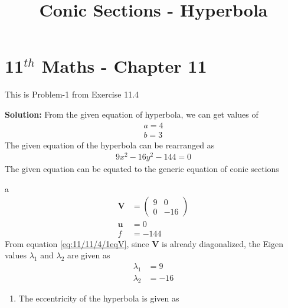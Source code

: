 \documentclass[12pt]{article}
\providecommand{\brak}[1]{\ensuremath{\left(#1\right)}}
\newcommand{\solution}{\noindent \textbf{Solution: }}
\newcommand{\myvec}[1]{\ensuremath{\begin{pmatrix}#1\end{pmatrix}}}
\let\vec\mathbf
\begin{document}
\begin{center}
\title{\textbf{Conic Sections - Hyperbola}}
\date{\vspace{-5ex}} %
\maketitle
\end{center}
\setcounter{page}{1}

\section{11$^{th}$ Maths - Chapter 11}
This is Problem-1 from Exercise 11.4
\begin{enumerate}
\solution 
From the given equation of hyperbola, we can get values of
\begin{align}
    a = 4 \\
    b = 3
\end{align}
The given equation of the hyperbola can be rearranged as
\begin{align}
    \label{eq:11/11/4/1hyperEq1}
    9x^2 - 16y^2-144 = 0 
\end{align}
\fi
The given equation can be equated to the generic equation of conic sections

a
\begin{align}
	\label{eq:11/11/4/1eqV}
	\vec{V} &= \myvec{ 9 & 0 \\ 0 & -16} \\
	\label{eq:11/11/4/1eqU}
	\vec{u} &=  0 \\
	\label{eq:11/11/4/1eqF}
	f &= -144 
\end{align}
From equation \eqref{eq:11/11/4/1eqV}, since $\vec{V}$ is already diagonalized, the Eigen values $\lambda_1$ and $\lambda_2$ are given as 
\begin{align}
	\label{eq:11/11/4/1eqEigen1}
	\lambda_1 &= 9 \\
	\label{eq:11/11/4/1eqEigen2}
	\lambda_2 &= -16 
\end{align}
\begin{enumerate}
\item The eccentricity of the hyperbola is given as  
\begin{align}

\end{align}
\end{enumerate}
\end{enumerate}
\end{document}
